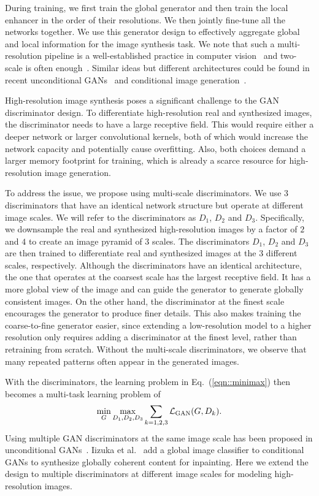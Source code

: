 \documentclass[10pt,twocolumn,letterpaper]{article}
\begin{document}
During training, we first train the global generator and then train the local enhancer in the order of their resolutions. We then jointly fine-tune all the networks together. We use this generator design to effectively aggregate global and local information for the image synthesis task. We note that such a multi-resolution pipeline is a well-established practice in computer vision~\cite{burt1983laplacian} and two-scale is often enough~\cite{brown2003recognising}. Similar ideas but different architectures could be found in recent unconditional GANs~\cite{denton2015deep,huang2017sgan} and conditional image generation~\cite{chen2017photographic,zhang2016stackgan}.

 High-resolution image synthesis poses a significant challenge to the GAN discriminator design. To differentiate high-resolution real and synthesized images, the discriminator needs to have a large receptive field. This would require either a deeper network or larger convolutional kernels, both of which would increase the network capacity and potentially cause overfitting. Also, both choices demand a larger memory footprint for training, which is already a scarce resource for high-resolution image generation.

To address the issue, we propose using multi-scale discriminators. We use $3$ discriminators that have an identical network structure but operate at different image scales. We will refer to the discriminators as $D_1$, $D_2$ and $D_3$. Specifically, we downsample the real and synthesized high-resolution images by a factor of $2$ and $4$ to create an image pyramid of 3 scales. The discriminators $D_1$, $D_2$ and $D_3$ are then trained to differentiate real and synthesized images at the $3$ different scales, respectively. Although the discriminators have an identical architecture, the one that operates at the coarsest scale has the largest receptive field. It has a more global view of the image and can guide the generator to generate globally consistent images. On the other hand, the discriminator at the finest scale encourages the generator to produce finer details. This also makes training the coarse-to-fine generator easier, since extending a low-resolution model to a higher resolution only requires adding a discriminator at the finest level, rather than retraining from scratch.
Without the multi-scale discriminators, we observe that many repeated patterns often appear in the generated images.

With the discriminators, the learning problem in Eq.~(\ref{eqn::minimax}) then becomes a multi-task learning problem of 
\begin{equation}
\small
\min_{G} \max_{D_1,D_2,D_3} \sum_{k=1,2,3}\mathcal{L}_{\text{GAN}}(G,D_k).
\end{equation}
Using multiple GAN discriminators at the same image scale has been proposed in unconditional GANs~\cite{durugkar2016generative}. Iizuka et al.~\cite{iizuka2017globally} add a global image classifier to conditional GANs to synthesize globally coherent content for inpainting.
Here we extend the design to multiple discriminators at different image scales for modeling high-resolution images. 
\end{document}
